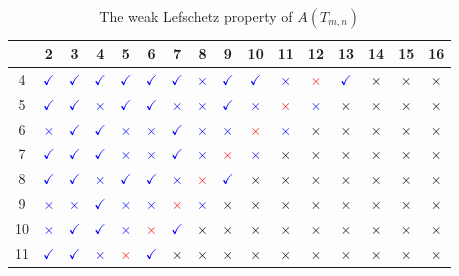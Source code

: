\documentclass[12pt,twoside]{amsart}
\theoremstyle{definition}
\theoremstyle{mystyle}
\begin{document}
\begin{table}[!ht]
	\centering
	\caption{The weak Lefschetz property of $A(T_{m,n})$}
	\label{tab:Tadpole_WLP}
	
	\newcommand{\wlpYes}{\textcolor{blue}{\ensuremath{\checkmark}}}
	\newcommand{\wlpNo}{\textcolor{blue}{\ensuremath{\times}}}
	\newcommand{\wlpLarge}{%
		\textcolor{black}{\ensuremath{\times}}}
		\newcommand{\wlpSixteen}{%
			\textcolor{red}{\ensuremath{\times}}}
	
	\begingroup
	\setlength{\tabcolsep}{5pt}
	\renewcommand{\arraystretch}{1.15}
	\begin{tabular}{|c|*{15}{c|}}
		\hline
		\diagbox{$m$}{$n$}
		& 2 & 3 & 4 & 5 & 6 & 7 & 8 & 9
		& 10 & 11 & 12 & 13 & 14 & 15 & 16\\
		\hline
		4
		& \wlpYes & \wlpYes & \wlpYes & \wlpYes & \wlpYes
		& \wlpYes & \wlpNo & \wlpYes & \wlpYes & \wlpNo
		& \wlpSixteen & \wlpYes & \wlpLarge & \wlpLarge & \wlpLarge\\
		\hline
		5
		& \wlpYes & \wlpYes & \wlpNo & \wlpYes & \wlpYes
		& \wlpNo & \wlpNo & \wlpYes & \wlpNo & \wlpSixteen
		& \wlpNo & \wlpLarge & \wlpLarge & \wlpLarge & \wlpLarge\\
		\hline
		6
		& \wlpNo & \wlpYes & \wlpYes & \wlpNo & \wlpNo
		& \wlpYes & \wlpNo & \wlpNo & \wlpSixteen & \wlpNo
		& \wlpLarge & \wlpLarge & \wlpLarge & \wlpLarge & \wlpLarge\\
		\hline
		7
		& \wlpYes & \wlpYes & \wlpYes & \wlpNo & \wlpNo
		& \wlpYes & \wlpNo & \wlpSixteen & \wlpNo & \wlpLarge
		& \wlpLarge & \wlpLarge & \wlpLarge & \wlpLarge & \wlpLarge\\
		\hline
		8
		& \wlpYes & \wlpYes & \wlpNo & \wlpYes & \wlpYes
		& \wlpNo & \wlpSixteen & \wlpYes & \wlpLarge & \wlpLarge
		& \wlpLarge & \wlpLarge & \wlpLarge & \wlpLarge & \wlpLarge\\
		\hline
		9
		& \wlpNo & \wlpNo & \wlpYes & \wlpNo & \wlpNo
		& \wlpSixteen & \wlpNo & \wlpLarge & \wlpLarge & \wlpLarge
		& \wlpLarge & \wlpLarge & \wlpLarge & \wlpLarge & \wlpLarge\\
		\hline
		10
		& \wlpNo & \wlpYes & \wlpYes & \wlpNo & \wlpSixteen
		& \wlpYes & \wlpLarge & \wlpLarge & \wlpLarge & \wlpLarge
		& \wlpLarge & \wlpLarge & \wlpLarge & \wlpLarge & \wlpLarge\\
		\hline
		11
		& \wlpYes & \wlpYes & \wlpNo & \wlpSixteen & \wlpYes
		& \wlpLarge & \wlpLarge & \wlpLarge & \wlpLarge & \wlpLarge
		& \wlpLarge & \wlpLarge & \wlpLarge & \wlpLarge & \wlpLarge\\

\end{tabular}
\end{table}
\end{document}
